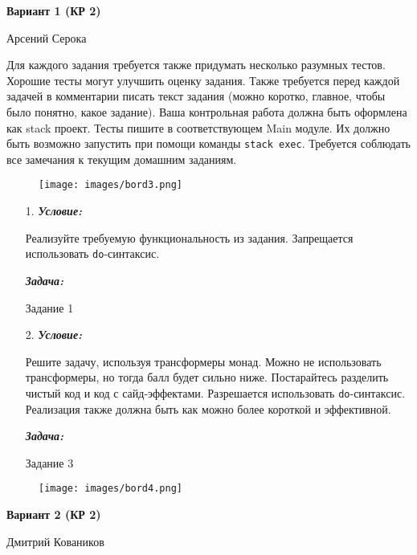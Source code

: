 \documentclass[11pt,a4paper]{article}
\begin{document}
%
%

\begin{center}
  \textbf{\LARGE{Вариант 1 (КР 2)} \\}

  Арсений Серока
\end{center}

Для каждого задания требуется также придумать несколько разумных тестов. Хорошие тесты могут улучшить оценку задания. Также требуется перед каждой задачей в комментарии писать текст задания (можно коротко, главное, чтобы было понятно, какое задание). Ваша контрольная работа должна быть оформлена как stack проект. Тесты пишите в соответствующем Main модуле. Их должно быть возможно запустить при помощи команды \texttt{stack exec}. Требуется соблюдать все замечания к текущим домашним заданиям.

\begin{figure}[H]
  \centering
  \texttt{[image: images/bord3.png]}
\end{figure}

\begin{enumerate}
  \item[1.]
  \textbf{\textit{Условие:}}

Реализуйте требуемую функциональность из задания. Запрещается использовать \texttt{do}-синтаксис.

  \textbf{\textit{Задача:}}

Задание 1
  \item[2.]
  \textbf{\textit{Условие:}}

Решите задачу, используя трансформеры монад. Можно не использовать трансформеры, но тогда балл будет сильно ниже. Постарайтесь разделить чистый код и код с сайд-эффектами. Разрешается использовать \texttt{do}-синтаксис. Реализация также должна быть как можно более короткой и эффективной.

  \textbf{\textit{Задача:}}

Задание 3
\end{enumerate}

\begin{figure}[H]
  \centering
  \texttt{[image: images/bord4.png]}
\end{figure}

\pagebreak

%
%

\begin{center}
  \textbf{\LARGE{Вариант 2 (КР 2)} \\}

  Дмитрий Коваников
\end{center}
\end{document}
